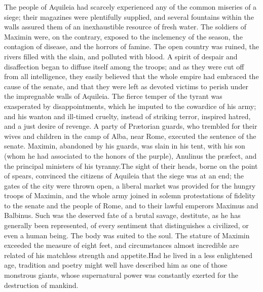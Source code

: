 The people of Aquileia had scarcely experienced any of the common
miseries of a siege; their magazines were plentifully supplied,
and several fountains within the walls assured them of an
inexhaustible resource of fresh water. The soldiers of Maximin
were, on the contrary, exposed to the inclemency of the season,
the contagion of disease, and the horrors of famine. The open
country was ruined, the rivers filled with the slain, and
polluted with blood. A spirit of despair and disaffection began
to diffuse itself among the troops; and as they were cut off from
all intelligence, they easily believed that the whole empire had
embraced the cause of the senate, and that they were left as
devoted victims to perish under the impregnable walls of
Aquileia. The fierce temper of the tyrant was exasperated by
disappointments, which he imputed to the cowardice of his army;
and his wanton and ill-timed cruelty, instead of striking terror,
inspired hatred, and a just desire of revenge. A party of
Prætorian guards, who trembled for their wives and children in
the camp of Alba, near Rome, executed the sentence of the senate.
Maximin, abandoned by his guards, was slain in his tent, with his
son (whom he had associated to the honors of the purple),
Anulinus the præfect, and the principal ministers of his tyranny.\footnotemark[36]
The sight of their heads, borne on the point of spears,
convinced the citizens of Aquileia that the siege was at an end;
the gates of the city were thrown open, a liberal market was
provided for the hungry troops of Maximin, and the whole army
joined in solemn protestations of fidelity to the senate and the
people of Rome, and to their lawful emperors Maximus and
Balbinus. Such was the deserved fate of a brutal savage,
destitute, as he has generally been represented, of every
sentiment that distinguishes a civilized, or even a human being.
The body was suited to the soul. The stature of Maximin exceeded
the measure of eight feet, and circumstances almost incredible
are related of his matchless strength and appetite.\footnotemark[37] Had he
lived in a less enlightened age, tradition and poetry might well
have described him as one of those monstrous giants, whose
supernatural power was constantly exerted for the destruction of
mankind.


